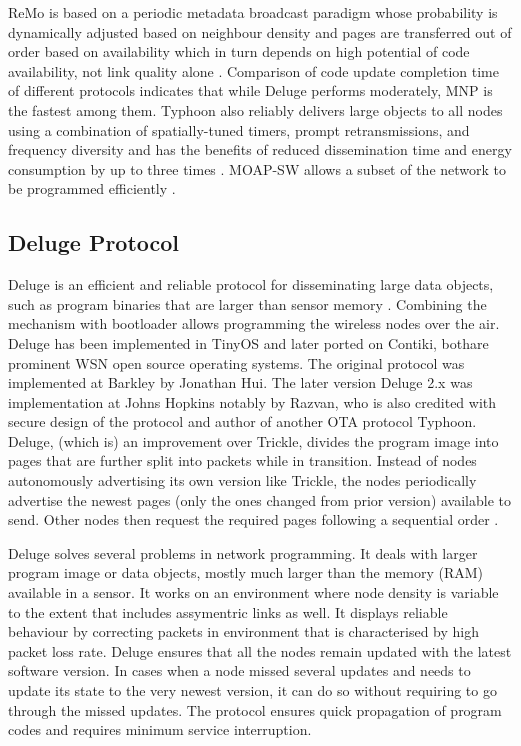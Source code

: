 \documentclass[conference,final]{IEEEtran}
\begin{document}
ReMo is based on a periodic metadata broadcast paradigm whose probability is dynamically adjusted based on neighbour density and pages are transferred out of order based on availability which in turn depends on high potential of code availability, not link quality alone \cite{ISI:000271540300007}.
Comparison of code update completion time of different protocols indicates that while Deluge performs moderately, MNP is the fastest among them.
Typhoon also reliably delivers large objects to all nodes using a combination of spatially-tuned timers, prompt retransmissions, and frequency diversity  and has the benefits of reduced dissemination time and energy consumption by up to three times \cite{liang2008typhoon}.
MOAP-SW allows a subset of the network to be programmed efficiently \cite{Maia20131277}.


\subsection{Deluge Protocol}
Deluge is an efficient and reliable protocol for disseminating large data objects, such as program binaries that are larger than sensor memory \cite{1031506}. 
Combining the mechanism with bootloader  allows programming the wireless nodes over the air.
Deluge has been implemented in TinyOS and later ported on Contiki, bothare prominent WSN open source operating systems.
The original protocol was implemented at Barkley by Jonathan Hui. %
The later version Deluge 2.x was implementation at Johns Hopkins notably by Razvan, who is also credited with secure design of the protocol and author of another OTA protocol Typhoon. %
Deluge, (which is) an improvement over Trickle,  divides the program image into pages that are further split into packets while in transition. 
Instead of nodes autonomously advertising its own version like Trickle, the nodes periodically advertise the newest pages (only the ones changed from prior version) available to send. 
Other nodes then request the required pages following a sequential order \cite{1031506}.

Deluge solves several problems in network programming. 
It deals with larger program image or data objects, mostly much larger than the memory (RAM) available in a sensor.
It works on an environment where node density is variable to the extent that includes assymentric links as well.
It displays reliable behaviour by correcting packets in environment that is characterised by high packet loss rate.
Deluge ensures that all the nodes remain updated with the latest software version.
In cases when a node missed several updates and needs to update its state to the very newest version, it can do so without requiring to go through the missed updates.
The protocol ensures quick propagation of program codes and requires minimum service interruption. 
\end{document}
